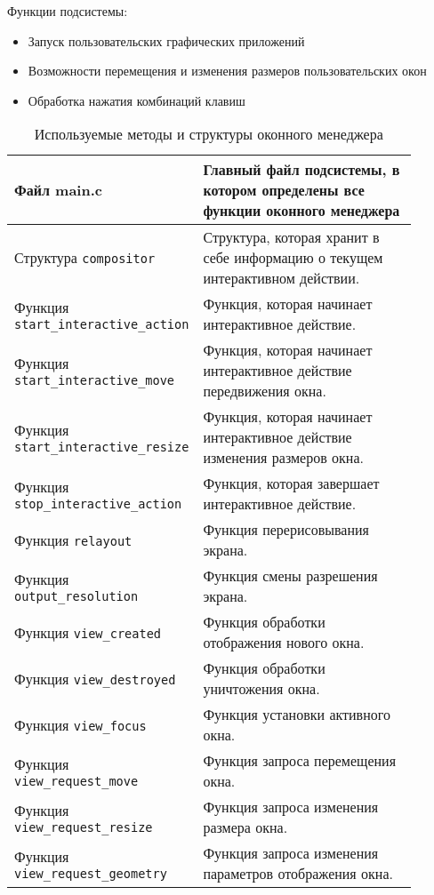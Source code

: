 \documentclass[10pt,a4paper]{report}
\begin{document}
Функции подсистемы:
\begin{itemize}
\item Запуск пользовательских графических приложений
\item Возможности перемещения и изменения размеров пользовательских окон
\item Обработка нажатия комбинаций клавиш
\end{itemize}

\begin{table}[H]
\caption{Используемые методы и структуры оконного менеджера}
\label{tabular:wmSystem}
\begin{center}
\begin{tabular}{| p{0.3\linewidth} | p{0.6\linewidth} |}
\hline
Файл main.c & Главный файл подсистемы, в котором определены все функции оконного менеджера\\
\hline
Структура \texttt{compositor} & Структура, которая хранит в себе информацию о текущем интерактивном действии.\\
\hline
Функция \texttt{start\_interactive\_action} & Функция, которая начинает интерактивное действие.\\
\hline
Функция \texttt{start\_interactive\_move} & Функция, которая начинает интерактивное действие передвижения окна.\\
\hline
Функция \texttt{start\_interactive\_resize} & Функция, которая начинает интерактивное действие изменения размеров окна.\\
\hline
Функция \texttt{stop\_interactive\_action} & Функция, которая завершает интерактивное действие.\\
\hline
Функция \texttt{relayout} & Функция перерисовывания экрана.\\
\hline
Функция \texttt{output\_resolution} & Функция смены разрешения экрана.\\
\hline
Функция \texttt{view\_created} & Функция обработки отображения нового окна.\\
\hline
Функция \texttt{view\_destroyed} & Функция обработки уничтожения окна.\\
\hline
Функция \texttt{view\_focus} & Функция установки активного окна.\\
\hline
Функция \texttt{view\_request\_move} & Функция запроса перемещения окна.\\
\hline
Функция \texttt{view\_request\_resize} & Функция запроса изменения размера окна.\\
\hline
Функция \texttt{view\_request\_geometry} & Функция запроса изменения параметров отображения окна.\\

\end{tabular}
\end{center}
\end{table}
\end{document}
